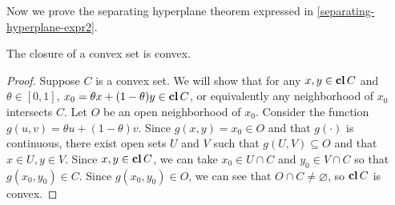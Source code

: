 \documentclass[12pt]{article}
\begin{document}
Now we prove the separating hyperplane theorem expressed in \ref{separating-hyperplane-expr2}.

\begin{lemma}\label{closure-convex}
    The closure of a convex set is convex.
\end{lemma}
\begin{proof}
    Suppose \(C\) is a convex set. We will show that for any \(x,y\in\operatorname{\mathbf{cl}} C\) and \(\theta\in[0,1]\), \(x_0=\theta x+(1-\theta)y\in\operatorname{\mathbf{cl}} C\), or equivalently any neighborhood of \(x_0\) intersects \(C\). Let \(O\) be an open neighborhood of \(x_0\). Consider the function \(g(u,v)=\theta u+(1-\theta)v\). Since \(g(x,y)=x_0\in O\) and that \(g(\cdot)\) is continuous, there exist open sets \(U\) and \(V\) such that \(g(U,V)\subseteq O\) and that \(x\in U,y\in V\). Since \(x,y\in\operatorname{\mathbf{cl}} C\), we can take \(x_0\in U\cap C\) and \(y_0\in V\cap C\) so that \(g(x_0,y_0)\in C\). Since \(g(x_0,y_0)\in O\), we can see that \(O\cap C\neq\varnothing\), so \(\operatorname{\mathbf{cl}} C\) is convex.
\end{proof}
\end{document}
